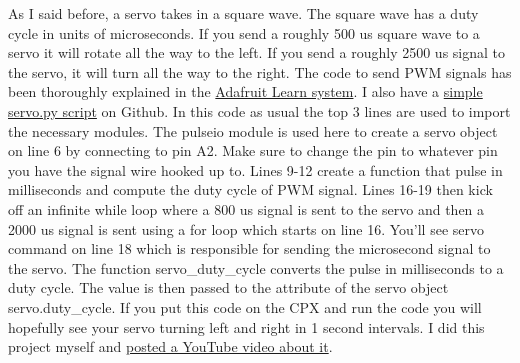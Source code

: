 As I said before, a servo takes in a square wave. The square wave has a duty cycle in units of microseconds. If you send a roughly 500 us square wave to a servo it will rotate all the way to the left. If you send a roughly 2500 us signal to the servo, it will turn all the way to the right. The code to send PWM signals has been thoroughly explained in the \href{https://learn.adafruit.com/using-servos-with-circuitpython/overview}{Adafruit Learn system}. I also have a \href{https://github.com/cmontalvo251/Microcontrollers/blob/master/Circuit_Playground/CircuitPython/Servo/servo.py}{simple servo.py script} on Github. In this code as usual the top 3 lines are used to import the necessary modules. The pulseio module is used here to create a servo object on line 6 by connecting to pin A2. Make sure to change the pin to whatever pin you have the signal wire hooked up to. Lines 9-12 create a function that pulse in milliseconds and compute the duty cycle of PWM signal. Lines 16-19 then kick off an infinite while loop where a 800 us signal is sent to the servo and then a 2000 us signal is sent using a for loop which starts on line 16. You’ll see servo command on line 18 which is responsible for sending the microsecond signal to the servo. The function servo\_duty\_cycle converts the pulse in milliseconds to a duty cycle. The value is then passed to the attribute of the servo object servo.duty\_cycle. If you put this code on the CPX and run the code you will hopefully see your servo turning left and right in 1 second intervals. I did this project myself and \href{https://youtu.be/ynlGiPZk5VM}{posted a YouTube video about it}. 

